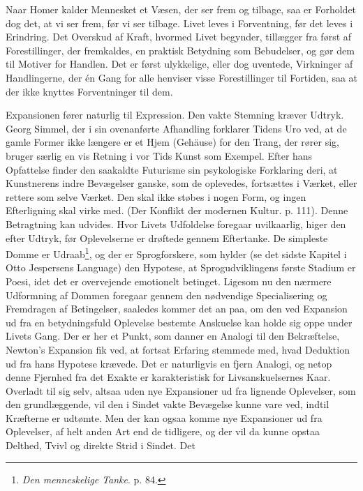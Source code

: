\documentclass[12pt]{article}
\newcommand{\opage}[1]{\marginnote{\footnotesize\textit{[#1]}}}
\begin{document}
Naar Homer kalder Mennesket et Væsen, der ser frem og tilbage, saa er
Forholdet dog det, at vi ser frem, før vi ser tilbage. Livet leves i
Forventning, før det leves i Erindring. Det Overskud af Kraft, hvormed
Livet begynder, tillægger fra først af Forestillinger, der fremkaldes,
en praktisk Betydning som Bebudelser, og gør dem til Motiver for
Handlen. Det er først ulykkelige, eller dog uventede, Virkninger af
Handlingerne, der én Gang for alle henviser visse Forestillinger til
Fortiden, saa at der ikke knyttes Forventninger til dem.

Expansionen fører naturlig til Expression. Den vakte Stemning kræver
Udtryk. Georg Simmel, der i sin ovenanførte Afhandling forklarer Tidens
Uro ved, at de gamle Former ikke længere er et Hjem (Gehäuse) for den
Trang, der rører sig, bruger særlig en vis Retning i vor Tids Kunst som
Exempel. Efter hans Opfattelse finder den saakaldte Futurisme sin
psykologiske Forklaring deri, at \guillemotright{}Kunstnerens indre Bevægelser
ganske, som de oplevedes, fortsættes i Værket, eller rettere som selve
Værket\guillemotleft{}. Den skal ikke støbes i nogen Form, og ingen Efterligning
skal virke med. (Der Konflikt der modernen Kultur. p. 111). Denne
Betragtning kan udvides. Hvor Livets Udfoldelse
\setcounter{footnote}{0}%
\opage{58}foregaar uvilkaarlig, higer den efter Udtryk, før Oplevelserne er
drøftede gennem Eftertanke. De simpleste Domme er
Udraab\footnote{\textit{Den menneskelige Tanke}. p. 84.}, og der er
Sprogforskere, som hylder (se det sidste Kapitel i Otto Jespersens
\guillemotright{}Language\guillemotleft{}) den Hypotese, at Sprogudviklingens første Stadium er
Poesi, idet det er overvejende emotionelt betinget. Ligesom nu den
nærmere Udformning af Dommen foregaar gennem den nødvendige
Specialisering og Fremdragen af Betingelser, saaledes kommer det an
paa, om den ved Expansion ud fra en betydningsfuld Oplevelse bestemte
Anskuelse kan holde sig oppe under Livets Gang. Der er her et Punkt,
som danner en Analogi til den Bekræftelse, Newton's Expansion fik ved,
at fortsat Erfaring stemmede med, hvad Deduktion ud fra hans Hypotese
krævede. Det er naturligvis en fjern Analogi, og netop denne Fjernhed
fra det Exakte er karakteristisk for Livsanskuelsernes Kaar. Overladt
til sig selv, altsaa uden nye Expansioner ud fra lignende Oplevelser,
som den grundlæggende, vil den i Sindet vakte Bevægelse kunne vare
ved, indtil Kræfterne er udtømte. Men der kan ogsaa komme nye
Expansioner ud fra Oplevelser, af helt anden Art end de tidligere, og
der vil da kunne opstaa Delthed, Tvivl og direkte Strid i Sindet. Det
\end{document}
